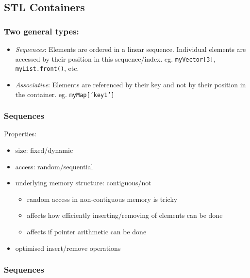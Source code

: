 \subsection{STL Containers}\label{stl-containers}

\subsubsection{Two general types:}\label{two-general-types}

\begin{itemize}
\item
  \emph{Sequences}: Elements are ordered in a linear sequence.
  Individual elements are accessed by their position in this
  sequence/index. eg. \texttt{myVector{[}3{]}}, \texttt{myList.front()},
  etc.
\item
  \emph{Associative}: Elements are referenced by their key and not by
  their position in the container. eg. \texttt{myMap{[}'key1'{]}}
\end{itemize}

\subsubsection{Sequences}\label{sequences}

Properties:

\begin{itemize}
\itemsep1pt\parskip0pt
\item
  size: fixed/dynamic
\item
  access: random/sequential
\item
  underlying memory structure: contiguous/not

  \begin{itemize}
  \itemsep1pt\parskip0pt
  \item
    random access in non-contiguous memory is tricky
  \item
    affects how efficiently inserting/removing of elements can be done
  \item
    affects if pointer arithmetic can be done
  \end{itemize}
\item
  optimised insert/remove operations
\end{itemize}

\subsubsection{Sequences}\label{sequences-1}

